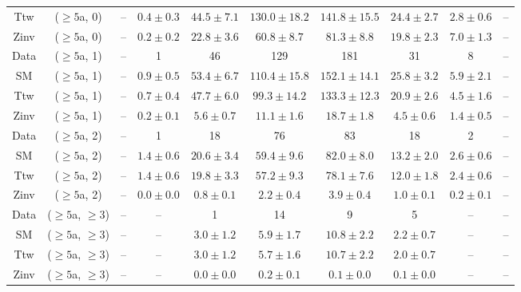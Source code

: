\begin{table}[h!]
{\begin{tabular}{cccccccccc}
	Ttw & ($\ge5$a, 0) & -- & $0.4\pm 0.3$ & $44.5\pm 7.1$ & $130.0\pm 18.2$ & $141.8\pm 15.5$ & $24.4\pm 2.7$ & $2.8\pm 0.6$ & -- \\[0.5ex] 
	Zinv & ($\ge5$a, 0) & -- & $0.2\pm 0.2$ & $22.8\pm 3.6$ & $60.8\pm 8.7$ & $81.3\pm 8.8$ & $19.8\pm 2.3$ & $7.0\pm 1.3$ & -- \\[0.5ex] 
	Data & ($\ge5$a, 1) & -- & 1 & 46 & 129 & 181 & 31 & 8 & -- \\[0.5ex] 
	SM & ($\ge5$a, 1) & -- & $0.9\pm 0.5$ & $53.4\pm 6.7$ & $110.4\pm 15.8$ & $152.1\pm 14.1$ & $25.8\pm 3.2$ & $5.9\pm 2.1$ & -- \\[0.5ex] 
	Ttw & ($\ge5$a, 1) & -- & $0.7\pm 0.4$ & $47.7\pm 6.0$ & $99.3\pm 14.2$ & $133.3\pm 12.3$ & $20.9\pm 2.6$ & $4.5\pm 1.6$ & -- \\[0.5ex] 
	Zinv & ($\ge5$a, 1) & -- & $0.2\pm 0.1$ & $5.6\pm 0.7$ & $11.1\pm 1.6$ & $18.7\pm 1.8$ & $4.5\pm 0.6$ & $1.4\pm 0.5$ & -- \\[0.5ex] 
	Data & ($\ge5$a, 2) & -- & 1 & 18 & 76 & 83 & 18 & 2 & -- \\[0.5ex] 
	SM & ($\ge5$a, 2) & -- & $1.4\pm 0.6$ & $20.6\pm 3.4$ & $59.4\pm 9.6$ & $82.0\pm 8.0$ & $13.2\pm 2.0$ & $2.6\pm 0.6$ & -- \\[0.5ex] 
	Ttw & ($\ge5$a, 2) & -- & $1.4\pm 0.6$ & $19.8\pm 3.3$ & $57.2\pm 9.3$ & $78.1\pm 7.6$ & $12.0\pm 1.8$ & $2.4\pm 0.6$ & -- \\[0.5ex] 
	Zinv & ($\ge5$a, 2) & -- & $0.0\pm 0.0$ & $0.8\pm 0.1$ & $2.2\pm 0.4$ & $3.9\pm 0.4$ & $1.0\pm 0.1$ & $0.2\pm 0.1$ & -- \\[0.5ex] 
	Data & ($\ge5$a, $\ge3$) & -- & -- & 1 & 14 & 9 & 5 & -- & -- \\[0.5ex] 
	SM & ($\ge5$a, $\ge3$) & -- & -- & $3.0\pm 1.2$ & $5.9\pm 1.7$ & $10.8\pm 2.2$ & $2.2\pm 0.7$ & -- & -- \\[0.5ex] 
	Ttw & ($\ge5$a, $\ge3$) & -- & -- & $3.0\pm 1.2$ & $5.7\pm 1.6$ & $10.7\pm 2.2$ & $2.0\pm 0.7$ & -- & -- \\[0.5ex] 
	Zinv & ($\ge5$a, $\ge3$) & -- & -- & $0.0\pm 0.0$ & $0.2\pm 0.1$ & $0.1\pm 0.0$ & $0.1\pm 0.0$ & -- & -- \\[0.5ex] 
	\hline
	\hline
\end{tabular}}
\end{table}
